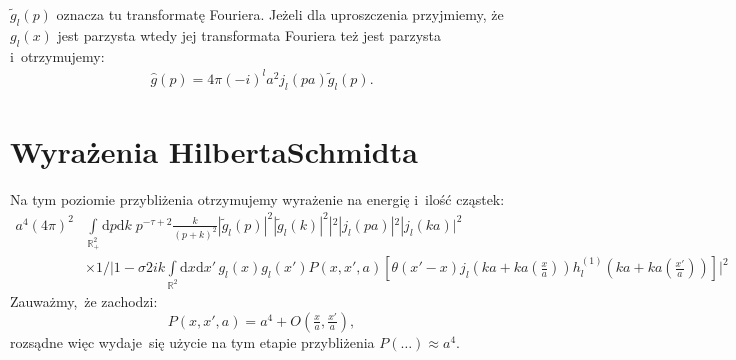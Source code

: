 \documentclass[a4paper,11pt]{article}
\newcommand{\de}{\mathrm{d}}
\newcommand{\gH}{\widehat{ g }}
\begin{document}
$\widetilde{ g }_{ l }( p )$ oznacza tu transformatę Fouriera. Jeżeli dla uproszczenia przyjmiemy, że~$g_{ l }( x )$ jest parzysta wtedy jej transformata Fouriera też jest parzysta i~otrzymujemy:
\begin{equation}
\begin{split}
\gH( p ) = 4 \pi ( -i )^{ l } a^{ 2 } j_{ l }( p a ) \widetilde{ g }_{ l }( p ). \label{eq:26}
\end{split}
\end{equation}

\section*{Wyrażenia Hilberta\dywiz Schmidta}
Na tym poziomie przybliżenia otrzymujemy wyrażenie na energię i~ilość cząstek:
\begin{equation}
\begin{split}
a^{ 4 } ( 4 \pi )^{ 2 } & \int\limits_{ \mathbb{R}_{ + }^{ 2 } } \de p \de k \; p^{ -\tau + 2 } \frac{ k }{ ( p + k )^{ 2 } } | \widetilde{ g }_{ l }( p ) |^{ 2 } | \widetilde{ g }_{ l }( k ) |^{ 2 } |^{ 2 } | j_{ l }( pa ) |^{ 2 } | j_{ l }( ka ) |^{ 2 } \\
&\times 1/\Big| 1 - \sigma 2 i k \int\limits_{ \mathbb{R}^{ 2 } } \de x \de x' \, g_{ l }( x ) g_{ l }( x' ) P( x, x', a ) \left[ \theta( x' - x ) j_{ l }\left( ka + ka \left( \tfrac{ x }{ a } \right) \right) h_{ l }^{ ( 1 ) }( ka + ka ( \tfrac{ x' }{ a } ) ) \right] \Big|^{ 2 }
\end{split} 
\end{equation}
Zauważmy,~że zachodzi:
\begin{equation}
P( x, x', a ) = a^{ 4 } + O( \tfrac{ x }{ a }, \tfrac{ x ' }{ a } ),
\end{equation}
rozsądne więc wydaje~się użycie na tym etapie przybliżenia $P( \ldots ) \approx a^{ 4 }$.
\end{document}
